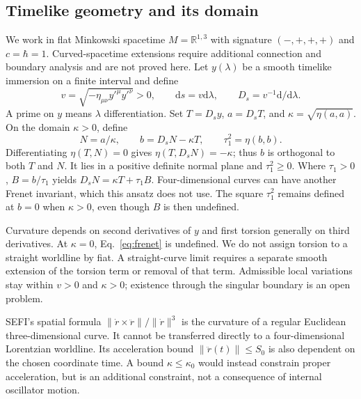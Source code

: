 \documentclass[aip,jmp,reprint,onecolumn,amsmath,amssymb]{revtex4-2}
\newcommand{\dd}{\mathrm{d}}
\newcommand{\Ds}{D_s}
\begin{document}
\subsection{Timelike geometry and its domain}
We work in flat Minkowski spacetime $M=\mathbb R^{1,3}$ with signature $(-,+,+,+)$ and $c=\hbar=1$. Curved-spacetime extensions require additional connection and boundary analysis and are not proved here. Let $y(\lambda)$ be a smooth timelike immersion on a finite interval and define
\begin{equation}
 v=\sqrt{-\eta_{\mu\nu}y'^{\mu}y'^{\nu}}>0,
 \qquad \dd s=v\dd\lambda,\qquad
 \Ds=v^{-1}\dd/\dd\lambda .
 \label{eq:proper}
\end{equation}
A prime on $y$ means $\lambda$ differentiation. Set $T=\Ds y$, $a=\Ds T$, and $\kappa=\sqrt{\eta(a,a)}$. On the domain $\kappa>0$, define
\begin{equation}
 N=a/\kappa,\qquad b=\Ds N-\kappa T,
 \qquad \tau_1^2=\eta(b,b).
 \label{eq:frenet}
\end{equation}
Differentiating $\eta(T,N)=0$ gives $\eta(T,\Ds N)=-\kappa$; thus $b$ is orthogonal to both $T$ and $N$. It lies in a positive definite normal plane and $\tau_1^2\geq0$. Where $\tau_1>0$, $B=b/\tau_1$ yields $\Ds N=\kappa T+\tau_1B$. Four-dimensional curves can have another Frenet invariant, which this ansatz does not use. The square $\tau_1^2$ remains defined at $b=0$ when $\kappa>0$, even though $B$ is then undefined.

Curvature depends on second derivatives of $y$ and first torsion generally on third derivatives. At $\kappa=0$, Eq.~\eqref{eq:frenet} is undefined. We do not assign torsion to a straight worldline by fiat. A straight-curve limit requires a separate smooth extension of the torsion term or removal of that term. Admissible local variations stay within $v>0$ and $\kappa>0$; existence through the singular boundary is an open problem.

SEFI's spatial formula $\|\dot r\times\ddot r\|/\|\dot r\|^3$ is the curvature of a regular Euclidean three-dimensional curve. It cannot be transferred directly to a four-dimensional Lorentzian worldline. Its acceleration bound $\|\ddot r(t)\|\leq S_0$ is also dependent on the chosen coordinate time. A bound $\kappa\leq\kappa_0$ would instead constrain proper acceleration, but is an additional constraint, not a consequence of internal oscillator motion.
\end{document}
